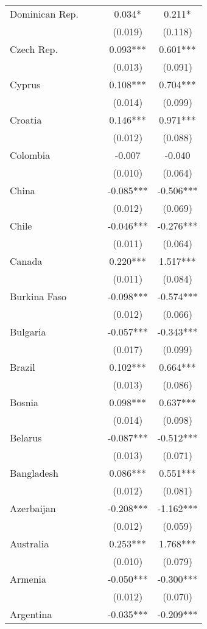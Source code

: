 \documentclass[]{article}
\begin{document}
\begin{tabular}{lcccc}
Dominican Rep. &  &  & 0.034* & 0.211* \\
 &  &  & (0.019) & (0.118) \\
Czech Rep. &  &  & 0.093*** & 0.601*** \\
 &  &  & (0.013) & (0.091) \\
Cyprus &  &  & 0.108*** & 0.704*** \\
 &  &  & (0.014) & (0.099) \\
Croatia &  &  & 0.146*** & 0.971*** \\
 &  &  & (0.012) & (0.088) \\
Colombia &  &  & -0.007 & -0.040 \\
 &  &  & (0.010) & (0.064) \\
China &  &  & -0.085*** & -0.506*** \\
 &  &  & (0.012) & (0.069) \\
Chile &  &  & -0.046*** & -0.276*** \\
 &  &  & (0.011) & (0.064) \\
Canada &  &  & 0.220*** & 1.517*** \\
 &  &  & (0.011) & (0.084) \\
Burkina Faso &  &  & -0.098*** & -0.574*** \\
 &  &  & (0.012) & (0.066) \\
Bulgaria &  &  & -0.057*** & -0.343*** \\
 &  &  & (0.017) & (0.099) \\
Brazil &  &  & 0.102*** & 0.664*** \\
 &  &  & (0.013) & (0.086) \\
Bosnia &  &  & 0.098*** & 0.637*** \\
 &  &  & (0.014) & (0.098) \\
Belarus &  &  & -0.087*** & -0.512*** \\
 &  &  & (0.013) & (0.071) \\
Bangladesh &  &  & 0.086*** & 0.551*** \\
 &  &  & (0.012) & (0.081) \\
Azerbaijan &  &  & -0.208*** & -1.162*** \\
 &  &  & (0.012) & (0.059) \\
Australia &  &  & 0.253*** & 1.768*** \\
 &  &  & (0.010) & (0.079) \\
Armenia &  &  & -0.050*** & -0.300*** \\
 &  &  & (0.012) & (0.070) \\
Argentina &  &  & -0.035*** & -0.209*** \\

\end{tabular}
\end{document}
